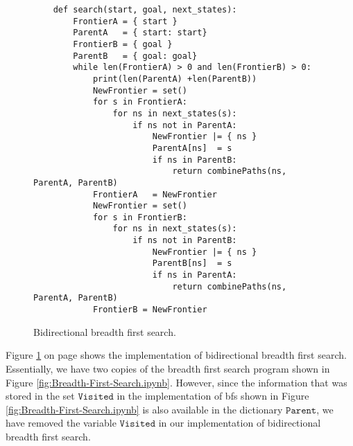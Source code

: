 \begin{figure}[!ht]
\centering
\begin{verbatim}
    def search(start, goal, next_states):        
        FrontierA = { start }
        ParentA   = { start: start}
        FrontierB = { goal }
        ParentB   = { goal: goal} 
        while len(FrontierA) > 0 and len(FrontierB) > 0:
            print(len(ParentA) +len(ParentB))
            NewFrontier = set()
            for s in FrontierA:
                for ns in next_states(s):
                    if ns not in ParentA:
                        NewFrontier |= { ns }
                        ParentA[ns]  = s
                        if ns in ParentB:
                            return combinePaths(ns, ParentA, ParentB)
            FrontierA   = NewFrontier
            NewFrontier = set()
            for s in FrontierB:
                for ns in next_states(s):
                    if ns not in ParentB:
                        NewFrontier |= { ns }
                        ParentB[ns]  = s
                        if ns in ParentA:
                            return combinePaths(ns, ParentA, ParentB)
            FrontierB = NewFrontier
\end{verbatim}
\vspace*{-0.3cm}
\caption{Bidirectional breadth first search.}
\label{fig:Bidirectional-BFS.ipynb}
\end{figure}

Figure \ref{fig:Bidirectional-BFS.ipynb} on page \pageref{fig:Bidirectional-BFS.ipynb} shows the implementation
of bidirectional breadth first search.  Essentially, we have two copies of the breadth first search program shown in
Figure \ref{fig:Breadth-First-Search.ipynb}.  However, since the information that was stored in the set
$\texttt{Visited}$ in the implementation of \ac{bfs} shown in Figure \ref{fig:Breadth-First-Search.ipynb} is
also available in the dictionary $\texttt{Parent}$, we have removed the variable $\texttt{Visited}$ in our
implementation of bidirectional breadth first search.

